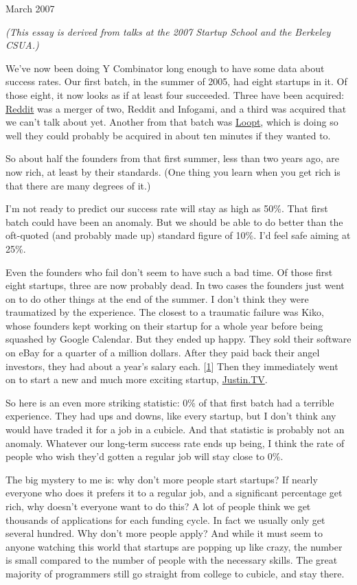 March 2007

\emph{(This essay is derived from talks at the 2007 Startup School and
the Berkeley CSUA.)}

We've now been doing Y Combinator long enough to have some data about
success rates. Our first batch, in the summer of 2005, had eight
startups in it. Of those eight, it now looks as if at least four
succeeded. Three have been acquired: \href{http://reddit.com}{Reddit}
was a merger of two, Reddit and Infogami, and a third was acquired that
we can't talk about yet. Another from that batch was
\href{http://loopt.com}{Loopt}, which is doing so well they could
probably be acquired in about ten minutes if they wanted to.

So about half the founders from that first summer, less than two years
ago, are now rich, at least by their standards. (One thing you learn
when you get rich is that there are many degrees of it.)

I'm not ready to predict our success rate will stay as high as 50\%.
That first batch could have been an anomaly. But we should be able to do
better than the oft-quoted (and probably made up) standard figure of
10\%. I'd feel safe aiming at 25\%.

Even the founders who fail don't seem to have such a bad time. Of those
first eight startups, three are now probably dead. In two cases the
founders just went on to do other things at the end of the summer. I
don't think they were traumatized by the experience. The closest to a
traumatic failure was Kiko, whose founders kept working on their startup
for a whole year before being squashed by Google Calendar. But they
ended up happy. They sold their software on eBay for a quarter of a
million dollars. After they paid back their angel investors, they had
about a year's salary each. {[}\hyperref[f1n]{1}{]} Then they
immediately went on to start a new and much more exciting startup,
\href{http://justin.tv}{Justin.TV}.

So here is an even more striking statistic: 0\% of that first batch had
a terrible experience. They had ups and downs, like every startup, but I
don't think any would have traded it for a job in a cubicle. And that
statistic is probably not an anomaly. Whatever our long-term success
rate ends up being, I think the rate of people who wish they'd gotten a
regular job will stay close to 0\%.

The big mystery to me is: why don't more people start startups? If
nearly everyone who does it prefers it to a regular job, and a
significant percentage get rich, why doesn't everyone want to do this? A
lot of people think we get thousands of applications for each funding
cycle. In fact we usually only get several hundred. Why don't more
people apply? And while it must seem to anyone watching this world that
startups are popping up like crazy, the number is small compared to the
number of people with the necessary skills. The great majority of
programmers still go straight from college to cubicle, and stay there.

